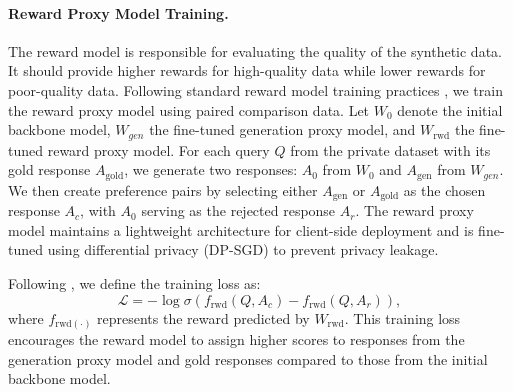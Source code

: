 \paragraph{Reward Proxy Model Training.}
The reward model is responsible for evaluating the quality of the synthetic data. 
It should provide higher rewards for high-quality data while lower rewards for poor-quality data.  
Following standard reward model training practices \citet{liu2024skywork}, we train the reward proxy model using paired comparison data. 
Let $W_0$ denote the initial backbone model, $W_{gen}$ the fine-tuned generation proxy model, and $W_{\text{rwd}}$ the fine-tuned reward proxy model. 
For each query $Q$ from the private dataset with its gold response $A_{\text{gold}}$, we generate two responses: $A_0$ from $W_0$ and $A_{\text{gen}}$ from $W_{gen}$. 
We then create preference pairs by selecting either $A_{\text{gen}}$ or $A_{\text{gold}}$ as the chosen response $A_c$, with $A_0$ serving as the rejected response $A_r$.
The reward proxy model maintains a lightweight architecture for client-side deployment and is fine-tuned using differential privacy (DP-SGD) to prevent privacy leakage. 


Following \citet{Ra2023DPO}, we define the training loss as:
\begin{equation}
\mathcal{L} = -\log \sigma\left( f_{\text{rwd}}(Q, A_c) - f_{\text{rwd}}(Q, A_r) \right),
\end{equation}
where $f_{\text{rwd}(\cdot)}$ represents the reward predicted by $W_\text{rwd}$.
This training loss encourages the reward model to assign higher scores to responses from the generation proxy model and gold responses compared to those from the initial backbone model. 

